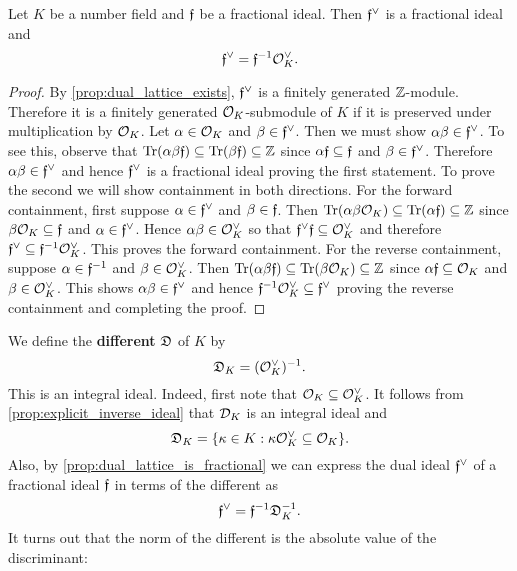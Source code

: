 \documentclass[12pt,oneside]{book}
\begin{document}
    \begin{proposition}\label{prop:dual_lattice_is_fractional}
      Let $K$ be a number field and $\mathfrak{f}$ be a fractional ideal. Then $\mathfrak{f}^{\vee}$ is a fractional ideal and
      \[
        \mathfrak{f}^{\vee} = \mathfrak{f}^{-1}\mathcal{O}_{K}^{\vee}.
      \]
    \end{proposition}
    \begin{proof}
      By \cref{prop:dual_lattice_exists}, $\mathfrak{f}^{\vee}$ is a finitely generated $\mathbb{Z}$-module. Therefore it is a finitely generated $\mathcal{O}_{K}$-submodule of $K$ if it is preserved under multiplication by $\mathcal{O}_{K}$. Let $\alpha \in \mathcal{O}_{K}$ and $\beta \in \mathfrak{f}^{\vee}$. Then we must show $\alpha\beta \in \mathfrak{f}^{\vee}$. To see this, observe that $\operatorname{\mathrm{Tr}}(\alpha\beta\mathfrak{f}) \subseteq \operatorname{\mathrm{Tr}}(\beta\mathfrak{f}) \subseteq \mathbb{Z}$ since $\alpha\mathfrak{f} \subseteq \mathfrak{f}$ and $\beta \in \mathfrak{f}^{\vee}$. Therefore $\alpha\beta \in \mathfrak{f}^{\vee}$ and hence $\mathfrak{f}^{\vee}$ is a fractional ideal proving the first statement. To prove the second we will show containment in both directions. For the forward containment, first suppose $\alpha \in \mathfrak{f}^{\vee}$ and $\beta \in \mathfrak{f}$. Then $\operatorname{\mathrm{Tr}}(\alpha\beta\mathcal{O}_{K}) \subseteq \operatorname{\mathrm{Tr}}(\alpha\mathfrak{f}) \subseteq \mathbb{Z}$ since $\beta\mathcal{O}_{K} \subseteq \mathfrak{f}$ and $\alpha \in \mathfrak{f}^{\vee}$. Hence $\alpha\beta \in \mathcal{O}_{K}^{\vee}$ so that $\mathfrak{f}^{\vee}\mathfrak{f} \subseteq \mathcal{O}_{K}^{\vee}$ and therefore $\mathfrak{f}^{\vee} \subseteq \mathfrak{f}^{-1}\mathcal{O}_{K}^{\vee}$. This proves the forward containment. For the reverse containment, suppose $\alpha \in \mathfrak{f}^{-1}$ and $\beta \in \mathcal{O}_{K}^{\vee}$. Then $\operatorname{\mathrm{Tr}}(\alpha\beta\mathfrak{f}) \subseteq \operatorname{\mathrm{Tr}}(\beta\mathcal{O}_{K}) \subseteq \mathbb{Z}$ since $\alpha\mathfrak{f} \subseteq \mathcal{O}_{K}$ and $\beta \in \mathcal{O}_{K}^{\vee}$. This shows $\alpha\beta \in \mathfrak{f}^{\vee}$ and hence $\mathfrak{f}^{-1}\mathcal{O}_{K}^{\vee} \subseteq \mathfrak{f}^{\vee}$ proving the reverse containment and completing the proof.
    \end{proof}

    We define the \textbf{different} $\mathfrak{D}$ of $K$ by
    \[
      \mathfrak{D}_{K} = (\mathcal{O}_{K}^{\vee})^{-1}.  
    \]
    This is an integral ideal. Indeed, first note that $\mathcal{O}_{K} \subseteq \mathcal{O}_{K}^{\vee}$. It follows from \cref{prop:explicit_inverse_ideal} that $\mathcal{D}_{K}$ is an integral ideal and
    \[
      \mathfrak{D}_{K} = \{\kappa \in K: \kappa\mathcal{O}_{K}^{\vee} \subseteq \mathcal{O}_{K}\}.  
    \]
    Also, by \cref{prop:dual_lattice_is_fractional} we can express the dual ideal $\mathfrak{f}^{\vee}$ of a fractional ideal $\mathfrak{f}$ in terms of the different as
    \[
      \mathfrak{f}^{\vee} = \mathfrak{f}^{-1}\mathfrak{D}_{K}^{-1}.
    \]
    It turns out that the norm of the different is the absolute value of the discriminant:
\end{document}
